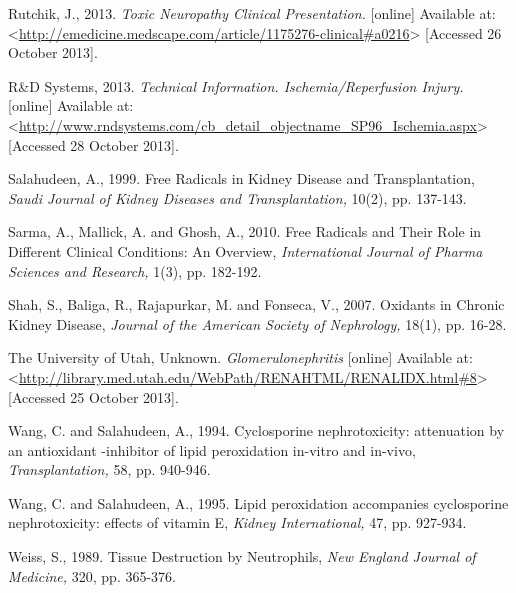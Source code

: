 \documentclass[11pt]{report}
\begin{document}
Rutchik, J., 2013. \textit{Toxic Neuropathy Clinical Presentation.} [online] Available at: <\url{http://emedicine.medscape.com/article/1175276-clinical#a0216}> [Accessed 26 October 2013].
\newline
\newline

R\&D Systems, 2013. \textit{Technical Information. Ischemia/Reperfusion Injury.} [online] Available at: <\url{http://www.rndsystems.com/cb_detail_objectname_SP96_Ischemia.aspx}> [Accessed 28 October 2013].
\newline
\newline

Salahudeen, A., 1999. Free Radicals in Kidney Disease and Transplantation, \textit{Saudi Journal of Kidney Diseases and Transplantation,} 10(2), pp. 137-143.
\newline
\newline

Sarma, A., Mallick, A. and Ghosh, A., 2010. Free Radicals and Their Role in Different Clinical Conditions: An Overview, \textit{International Journal of Pharma Sciences and Research,} 1(3), pp. 182-192.
\newline
\newline

Shah, S., Baliga, R., Rajapurkar, M. and Fonseca, V., 2007. Oxidants in Chronic Kidney Disease, \textit{Journal of the American Society of Nephrology,} 18(1), pp. 16-28.
\newline
\newline

The University of Utah, Unknown. \textit{Glomerulonephritis} [online] Available at: <\url{http://library.med.utah.edu/WebPath/RENAHTML/RENALIDX.html#8}> [Accessed 25 October 2013].
\newline
\newline

Wang, C. and Salahudeen, A., 1994. Cyclosporine nephrotoxicity: attenuation by an antioxidant -inhibitor of lipid peroxidation in-vitro and in-vivo, \textit{Transplantation,} 58, pp. 940-946.
\newline
\newline

Wang, C. and Salahudeen, A., 1995. Lipid peroxidation accompanies cyclosporine nephrotoxicity: effects of vitamin E, \textit{Kidney International,} 47, pp. 927-934.
\newline
\newline

Weiss, S., 1989. Tissue Destruction by Neutrophils, \textit{New England Journal of Medicine,} 320, pp. 365-376.
\newline
\newline
\end{document}
